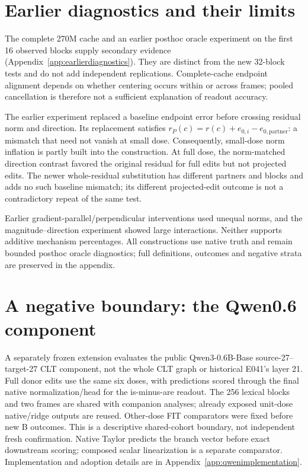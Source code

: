 \section{Earlier diagnostics and their limits}\label{sec:mechanism}
The complete 270M cache and an earlier posthoc oracle experiment on the first 16 observed blocks supply secondary evidence (Appendix~\ref{app:earlierdiagnostics}). They are distinct from the new 32-block tests and do not add independent replications. Complete-cache endpoint alignment depends on whether centering occurs within or across frames; pooled cancellation is therefore not a sufficient explanation of readout accuracy.

The earlier experiment replaced a baseline endpoint error before crossing residual norm and direction. Its replacement satisfies $r_P(c)=r(c)+e_{0,i}-e_{0,\mathrm{partner}}$: a mismatch that need not vanish at small dose. Consequently, small-dose norm inflation is partly built into the construction. At full dose, the norm-matched direction contrast favored the original residual for full edits but not projected edits. The newer whole-residual substitution has different partners and blocks and adds no such baseline mismatch; its different projected-edit outcome is not a contradictory repeat of the same test.

Earlier gradient-parallel/perpendicular interventions used unequal norms, and the magnitude--direction experiment showed large interactions. Neither supports additive mechanism percentages. All constructions use native truth and remain bounded posthoc oracle diagnostics; full definitions, outcomes and negative strata are preserved in the appendix.
\section{A negative boundary: the Qwen0.6 component}
\label{sec:qwen}

A separately frozen extension evaluates the public Qwen3-0.6B-Base source-27--target-27 CLT component, not the whole CLT graph or historical E041's layer 21. Full donor edits use the same six doses, with predictions scored through the final native normalization/head for the is-minus-are readout. The 256 lexical blocks and two frames are shared with companion analyses; already exposed unit-dose native/ridge outputs are reused. Other-dose FIT comparators were fixed before new B outcomes. This is a descriptive shared-cohort boundary, not independent fresh confirmation. Native Taylor predicts the branch vector before exact downstream scoring; composed scalar linearization is a separate comparator. Implementation and adoption details are in Appendix~\ref{app:qwenimplementation}.

